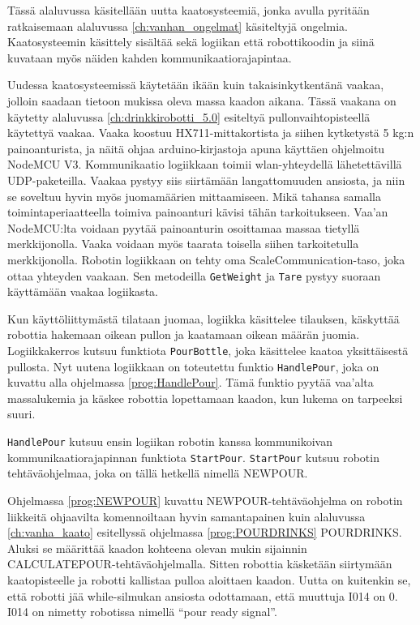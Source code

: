 Tässä alaluvussa käsitellään uutta kaatosysteemiä, jonka avulla pyritään ratkaisemaan alaluvussa \ref{ch:vanhan_ongelmat} käsiteltyjä ongelmia. Kaatosysteemin käsittely sisältää sekä logiikan että robottikoodin ja siinä kuvataan myös näiden kahden kommunikaatiorajapintaa.

Uudessa kaatosysteemissä käytetään ikään kuin takaisinkytkentänä vaakaa, jolloin saadaan tietoon mukissa oleva massa kaadon aikana. Tässä vaakana on käytetty alaluvussa \ref{ch:drinkkirobotti_5.0} esiteltyä pullonvaihtopisteellä käytettyä vaakaa. Vaaka koostuu HX711\hyp{}mittakortista ja siihen kytketystä 5 kg:n painoanturista, ja näitä ohjaa arduino\hyp{}kirjastoja apuna käyttäen ohjelmoitu NodeMCU V3. Kommunikaatio logiikkaan toimii wlan\hyp{}yhteydellä lähetettävillä UDP\hyp{}paketeilla. \cite{Virtanen2019} Vaakaa pystyy siis siirtämään langattomuuden ansiosta, ja niin se soveltuu hyvin myös juomamäärien mittaamiseen. Mikä tahansa samalla toimintaperiaatteella toimiva painoanturi kävisi tähän tarkoitukseen. Vaa'an NodeMCU:lta voidaan pyytää painoanturin osoittamaa massaa tietyllä merkkijonolla. Vaaka voidaan myös taarata toisella siihen tarkoitetulla merkkijonolla. Robotin logiikkaan on tehty oma ScaleCommunication-taso, joka ottaa yhteyden vaakaan. Sen metodeilla \texttt{GetWeight} ja \texttt{Tare} pystyy suoraan käyttämään vaakaa logiikasta.

Kun käyttöliittymästä tilataan juomaa, logiikka käsittelee tilauksen, käskyttää robottia hakemaan oikean pullon ja kaatamaan oikean määrän juomia. Logiikkakerros kutsuu funktiota \texttt{PourBottle}, joka käsittelee kaatoa yksittäisestä pullosta. Nyt uutena logiikkaan on toteutettu funktio \texttt{HandlePour}, joka on kuvattu alla ohjelmassa \ref{prog:HandlePour}. Tämä funktio pyytää vaa'alta massalukemia ja käskee robottia lopettamaan kaadon, kun lukema on tarpeeksi suuri.

\newpage

\lstset{style=sharpc}


\texttt{HandlePour} kutsuu ensin logiikan robotin kanssa kommunikoivan kommunikaatiorajapinnan funktiota \texttt{StartPour}. \texttt{StartPour} kutsuu robotin tehtäväohjelmaa, joka on tällä hetkellä nimellä NEWPOUR.

\lstset{style=Yaskawatyyli}


Ohjelmassa \ref{prog:NEWPOUR} kuvattu NEWPOUR\hyp{}tehtäväohjelma on robotin liikkeitä ohjaavilta komennoiltaan hyvin samantapainen kuin alaluvussa \ref{ch:vanha_kaato} esitellyssä ohjelmassa \ref{prog:POURDRINKS} POURDRINKS. Aluksi se määrittää kaadon kohteena olevan mukin sijainnin CALCULATEPOUR\hyp{}tehtäväohjelmalla. Sitten robottia käsketään siirtymään kaatopisteelle ja robotti kallistaa pulloa aloittaen kaadon. Uutta on kuitenkin se, että robotti jää while\hyp{}silmukan ansiosta odottamaan, että muuttuja I014 on 0. I014 on nimetty robotissa nimellä ``pour ready signal''.

